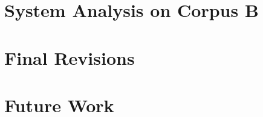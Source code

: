 \documentclass[11pt,letterpaper]{article}
\begin{document}
\section{System Analysis on Corpus B}

\section{Final Revisions}

\section{Future Work}




\label{lastpage}
\end{document}

